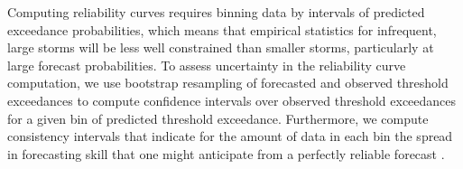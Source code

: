 Computing reliability curves requires binning data by intervals of predicted exceedance probabilities, which means that empirical statistics for infrequent, large storms will be less well constrained than smaller storms, particularly at large forecast probabilities. To assess uncertainty in the reliability curve computation, we use bootstrap resampling of forecasted and observed threshold exceedances to compute confidence intervals over observed threshold exceedances for a given bin of predicted threshold exceedance. Furthermore, we compute consistency intervals that indicate for the amount of data in each bin the spread in forecasting skill that one might anticipate from a perfectly reliable forecast \citep{Brocker2007}.